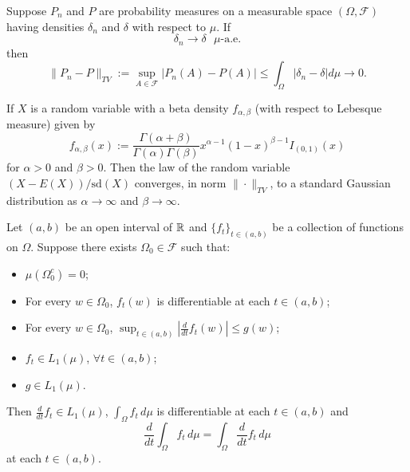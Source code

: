 \begin{theorem}
Suppose $P_n$ and $P$ are probability measures on a measurable space $(\Omega, \mathcal F)$ having densities $\delta_n$ and $\delta$ with respect to $\mu$. If
\[ \delta_n\rightarrow \delta\text{ $\mu$-a.e.} \]
then
\[
\| P_n - P\|_{TV}:=
\sup_{A\in \mathcal F}|P_n(A)-P(A)|\leq \int_\Omega |\delta_n - \delta| d\mu \rightarrow 0. \]
\end{theorem}

\begin{corollary}
If $X$ is a random variable with a beta density $f_{\alpha, \beta}$ (with respect to Lebesque measure) given by
\[f_{\alpha,\beta}(x):=\frac{\Gamma (\alpha+\beta)}{\Gamma(\alpha)\Gamma(\beta)} x^{\alpha-1}(1-x)^{\beta-1}I_{(0,1)}(x) \]
for $\alpha>0$ and $\beta>0$.
Then the law  of the random variable $(X - E(X))/\text{sd}(X)$ converges, in  norm $\| \cdot \|_{TV}$, to a standard Gaussian distribution as $\alpha\rightarrow\infty$ and $\beta\rightarrow\infty$.
\end{corollary}


\begin{theorem}
Let $(a,b)$ be an open interval of $\Bbb R$ and
 $\{f_t\}_{t\in(a,b)}$ be a collection of  functions on $\Omega$. Suppose  there exists $\Omega_0\in \mathcal F$  such that:
 \begin{itemize}
\item $\mu(\Omega_0^c)=0$;
\item For every $w\in\Omega_0$, $f_t(w)$ is  differentiable at each $t\in (a,b)$;
\item  For every $w\in \Omega_0$, $\sup_{t\in(a,b)}\left |\frac{d}{dt} f_t(w)\right|\leq g(w)$;
\item $f_t\in  L_1(\mu)$,  $\forall t\in(a,b)$;
\item $g\in L_1(\mu)$.
\end{itemize}
Then $\frac{d}{dt} f_t \in L_1(\mu)$, $ \int_\Omega f_t \,d\mu$ is differentiable at each $t\in (a,b)$  and
\[ \frac{d}{dt} \int_\Omega\! f_t \, d\mu =  \int_\Omega \frac{d}{dt} f_t \, d\mu\]
at each $t\in(a,b)$.
\end{theorem}

